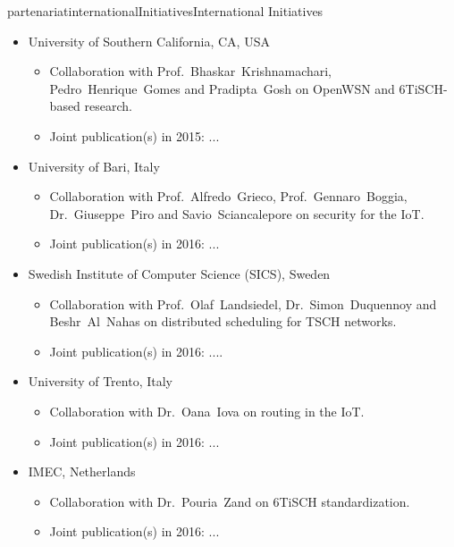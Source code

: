 \documentclass{ra2016}
\begin{document}
\begin{module}{partenariat}{internationalInitiatives}{International Initiatives}
\begin{itemize}
    \item University of Southern California, CA, USA
        \begin{itemize}
            \item Collaboration with Prof.~Bhaskar~Krishnamachari, Pedro~Henrique~Gomes and Pradipta~Gosh on OpenWSN and 6TiSCH-based research.
            \item Joint publication(s) in 2015: ...
        \end{itemize}
    
    \item University of Bari, Italy
        \begin{itemize}
            \item Collaboration with Prof.~Alfredo~Grieco, Prof.~Gennaro~Boggia, Dr.~Giuseppe~Piro and Savio~Sciancalepore on security for the IoT.
            \item Joint publication(s) in 2016: ...
        \end{itemize}
    
    \item Swedish Institute of Computer Science (SICS), Sweden
        \begin{itemize}
            \item Collaboration with Prof.~Olaf~Landsiedel, Dr.~Simon~Duquennoy and Beshr~Al~Nahas on distributed scheduling for TSCH networks.
            \item Joint publication(s) in 2016: ....
        \end{itemize}
    
    \item University of Trento, Italy
        \begin{itemize}
            \item Collaboration with Dr.~Oana~Iova on routing in the IoT.
            \item Joint publication(s) in 2016: ...
        \end{itemize}
    
    \item IMEC, Netherlands
        \begin{itemize}
            \item Collaboration with Dr.~Pouria~Zand on 6TiSCH standardization.
            \item Joint publication(s) in 2016: ...
        \end{itemize}
    
\end{itemize}


\end{module}
\end{document}
